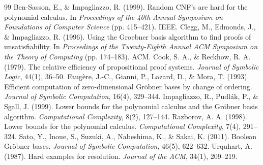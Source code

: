 \documentclass[11pt]{article}
\theoremstyle{plain}
\theoremstyle{definition}
\theoremstyle{remark}
\begin{document}
\begin{thebibliography}{99}
 Ben-Sasson, E., \& Impagliazzo, R. (1999). Random CNF's are hard for the polynomial calculus. In \textit{Proceedings of the 40th Annual Symposium on Foundations of Computer Science} (pp. 415--421). IEEE.
 Clegg, M., Edmonds, J., \& Impagliazzo, R. (1996). Using the Groebner basis algorithm to find proofs of unsatisfiability. In \textit{Proceedings of the Twenty-Eighth Annual ACM Symposium on the Theory of Computing} (pp. 174--183). ACM.
 Cook, S. A., \& Reckhow, R. A. (1979). The relative efficiency of propositional proof systems. \textit{Journal of Symbolic Logic}, 44(1), 36--50.
 Faug\`ere, J.-C., Gianni, P., Lazard, D., \& Mora, T. (1993). Efficient computation of zero-dimensional Gr\"obner bases by change of ordering. \textit{Journal of Symbolic Computation}, 16(4), 329--344.
 Impagliazzo, R., Pudl\'ak, P., \& Sgall, J. (1999). Lower bounds for the polynomial calculus and the Gr\"obner basis algorithm. \textit{Computational Complexity}, 8(2), 127--144.
 Razborov, A. A. (1998). Lower bounds for the polynomial calculus. \textit{Computational Complexity}, 7(4), 291--324.
 Sato, Y., Inoue, S., Suzuki, A., Nabeshima, K., \& Sakai, K. (2011). Boolean Gr\"obner bases. \textit{Journal of Symbolic Computation}, 46(5), 622--632.
 Urquhart, A. (1987). Hard examples for resolution. \textit{Journal of the ACM}, 34(1), 209--219.
\end{thebibliography}
\end{document}
